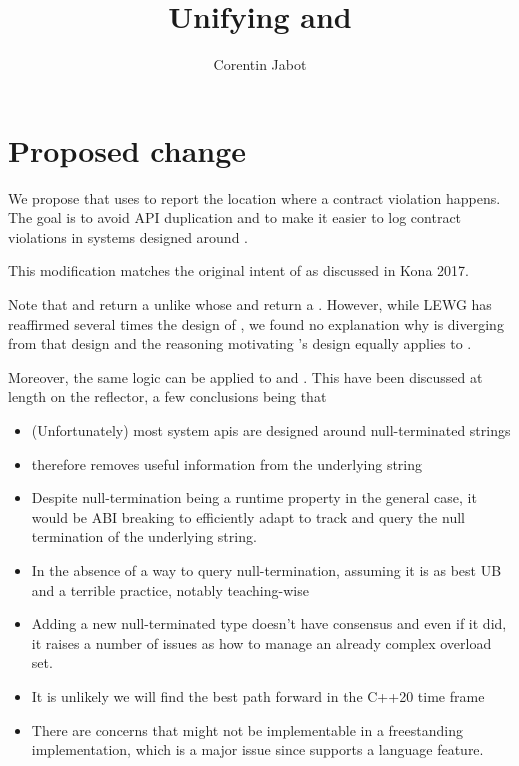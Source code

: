 \documentclass{wg21}
\title{Unifying \tcode{source\_location} and \tcode{contract\_violation}}
\author{Corentin Jabot}{corentin.jabot@gmail.com}
\begin{document}
\maketitle

\section{Proposed change}

We propose that  uses 
to report the location where a contract violation happens.
The goal is to avoid API duplication and to make it easier to log contract violations
in systems designed around  .

This modification matches the original intent of \cite{P0542} as discussed in Kona 2017.


Note that  and 
return a  unlike  whose 
and  return a .
However, while LEWG has reaffirmed several times the design of ,
we found no explanation why  is diverging from that design and
the reasoning motivating 's design equally applies  to .

Moreover, the same logic can be applied to  and .
This have been discussed at length on the reflector, a few conclusions being that

\begin{itemize}
	\item (Unfortunately) most system apis are designed around null-terminated strings
	\item {} therefore removes useful information from the underlying string
	\item Despite null-termination being a runtime property in the general case, it would be ABI breaking to efficiently adapt  to track and query the null termination of the underlying string.
	\item In the absence of a way to query null-termination, assuming it is as best UB and a terrible practice, notably teaching-wise
	\item Adding a new null-terminated  type doesn't have consensus and even if it did, it raises a number of issues as how to manage an already complex overload set.
	\item It is unlikely we will find the best path forward in the C++20 time frame
	\item There are concerns that  might not be implementable in a freestanding implementation, which is a major issue since  supports a language feature.
\end{itemize}
\end{document}
